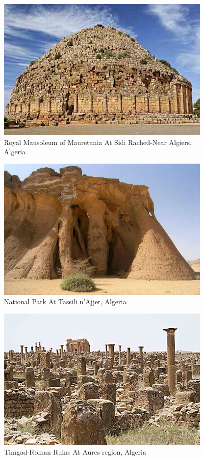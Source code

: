 \documentclass[Afour,sageh,times]{sagej}
\begin{document}
\begin{figure}
    \centering
    \includegraphics[scale=15]{Moretany.png}
    \caption{Royal Mausoleum of Mauretania At Sidi Rached-Near Algiers, Algeria}
    \label{fig:mauretania}
\end{figure}
\begin{figure}
    \centering
    \includegraphics[scale=15]{tassili.png}
    \caption{National Park At Tassili n'Ajjer, Algeria}
    \label{fig:Tassili}
\end{figure}
\begin{figure}
    \centering
    \includegraphics[scale=15]{Timgad.png}
    \caption{Timgad-Roman Ruins At Aures region, Algeria}
    \label{fig:Timgad}
\end{figure}
\end{document}
